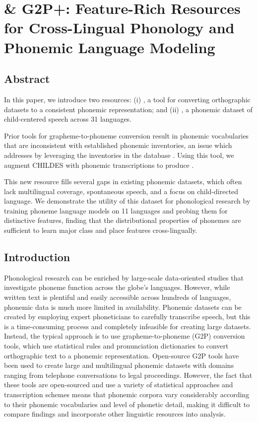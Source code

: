 \chapter{\ipachildes \& G2P+: Feature-Rich Resources for Cross-Lingual Phonology and Phonemic Language Modeling}
\section{Abstract}

In this paper, we introduce two resources: (i) \corpusphonemizer, a tool for converting orthographic datasets to a consistent phonemic representation; and (ii) \ipachildes, a phonemic dataset of child-centered speech across 31 languages. 

Prior tools for grapheme-to-phoneme conversion result in phonemic vocabularies that are inconsistent with established phonemic inventories, an issue which \corpusphonemizer addresses by leveraging the inventories in the \phoible database \citep{phoible}. 
Using this tool, we augment CHILDES \citep{macwhinney1985child} with phonemic transcriptions to produce \ipachildes.

This new resource fills several gaps in existing phonemic datasets, which often lack multilingual coverage, spontaneous speech, and a focus on child-directed language.
We demonstrate the utility of this dataset for phonological research by training phoneme language models on 11 languages and probing them for distinctive features, finding that the distributional properties of phonemes are sufficient to learn major class and place features cross-lingually.

\section{Introduction}

Phonological research can be enriched by large-scale data-oriented studies that investigate phoneme function across the globe's languages. However, while written text is plentiful and easily accessible across hundreds of languages, phonemic data is much more limited in availability. Phonemic datasets can be created by employing expert phoneticians to carefully transcribe speech, but this is a time-consuming process and completely infeasible for creating large datasets. Instead, the typical approach is to use grapheme-to-phoneme (G2P) conversion tools, which use statistical rules and pronunciation dictionaries to convert orthographic text to a phonemic representation. Open-source G2P tools have been used to create large and multilingual phonemic datasets with domains ranging from telephone conversations to legal proceedings. However, the fact that these tools are open-sourced and use a variety of statistical approaches and transcription schemes means that phonemic corpora vary considerably according to their phonemic vocabularies and level of phonetic detail, making it difficult to compare findings and incorporate other linguistic resources into analysis.

